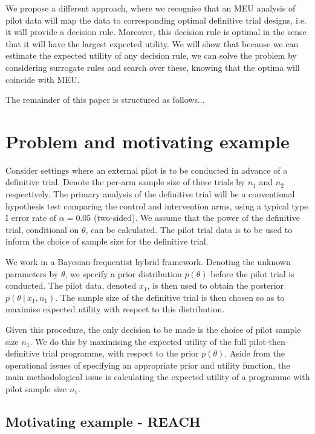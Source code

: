 \documentclass[sagev, Crown]{sagej} %
\begin{document}
We propose a different approach, where we recognise that an MEU analysis of pilot data will map the data to corresponding optimal definitive trial designs, i.e. it will provide a decision rule. Moreover, this decision rule is optimal in the sense that it will have the largest expected utility. We will show that because we can estimate the expected utility of any decision rule, we can solve the problem by considering surrogate rules and search over these, knowing that the optima will coincide with MEU. 

The remainder of this paper is structured as follows...

\section{Problem and motivating example}\label{sec:problem}

Consider settings where an external pilot is to be conducted in advance of a definitive trial. Denote the per-arm sample size of these trials by $n_1$ and $n_2$ respectively. The primary analysis of the definitive trial will be a conventional hypothesis test comparing the control and intervention arms, using a typical type I error rate of $\alpha = 0.05$ (two-sided). We assume that the power of the definitive trial, conditional on $\theta$, can be calculated. The pilot trial data is to be used to inform the choice of sample size for the definitive trial.

We work in a Bayesian-frequentist hybrid framework. Denoting the unknown parameters by $\theta$, we specify a prior distribution $p(\theta)$ before the pilot trial is conducted. The pilot data, denoted $x_1$, is then used to obtain the posterior $p(\theta ~|~ x_1, n_1)$. The sample size of the definitive trial is then chosen so as to maximise expected utility with respect to this distribution.

Given this procedure, the only decision to be made is the choice of pilot sample size $n_1$. We do this by maximising the expected utility of the full pilot-then-definitive trial programme, with respect to the prior $p(\theta)$. Aside from the operational issues of specifying an appropriate prior and utility function, the main methodological issue is calculating the expected utility of a programme with pilot sample size $n_1$. 

\subsection{Motivating example - REACH}
\end{document}
